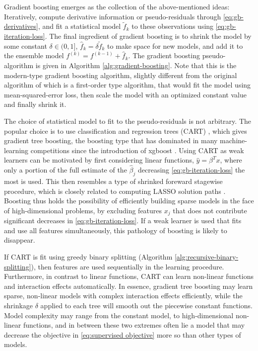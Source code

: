 Gradient boosting emerges as the collection of the above-mentioned ideas: Iteratively, compute derivative information or pseudo-residuals through \eqref{eq:gb-derivatives}, and fit a statistical model $\tilde{f}_k$ to these observations using \eqref{eq:gb-iteration-loss}.
The final ingredient of gradient boosting is to shrink the model by some constant $\delta\in(0,1]$, $\hat{f}_k=\delta \tilde{f}_k$ to make space for new models, and add it to the ensemble model $f^{(k)}=f^{(k-1)}+\hat{f}_k$.
The gradient boosting pseudo-algorithm is given in Algorithm \ref{alg:gradient-boosting}.
Note that this is the modern-type gradient boosting algorithm, slightly different from the original algorithm of \citet{friedman2001greedy} which is a first-order type algorithm, that would fit the model using mean-squared-error loss, then scale the model with an optimized constant value and finally shrink it.



The choice of statistical model to fit to the pseudo-residuals is not arbitrary.
The popular choice is to use classification and regression trees (CART) \citep{breiman1984classification}, which gives gradient tree boosting, the boosting type that has dominated in many machine-learning competitions since the introduction of xgboost \citep{chen2016xgboost}.
Using CART as weak learners can be motivated by first considering linear functions, $\hat{y}=\beta^Tx$, where only a portion of the full estimate of the $\hat{\beta}_j$ decreasing \eqref{eq:gb-iteration-loss} the most is used. This then resembles a type of shrinked foreward stagewise procedure, which is closely related to computing LASSO solution paths \citep{friedman2001elements}.
Boosting thus holds the possibility of efficiently building sparse models in the face of high-dimensional problems, by excluding features $x_j$ that does not contribute significant decreases in \eqref{eq:gb-iteration-loss}.
If a weak learner is used that fits and use all features simultaneously, this pathology of boosting is likely to disappear.

If CART is fit using greedy binary splitting (Algorithm \ref{alg:recursive-binary-splitting}), then features are used sequentially in the learning procedure.
Furthermore, in contrast to linear functions, CART can learn non-linear functions and interaction effects automatically.
In essence, gradient tree boosting may learn sparse, non-linear models with complex interaction effects efficiently, while the shrinkage $\delta$ applied to each tree will smooth out the piecewise constant functions.
Model complexity may range from the constant model, to high-dimensional non-linear functions, and in between these two extremes often lie a model that may decrease the objective in \eqref{eq:supervised objective} more so than other types of models.

